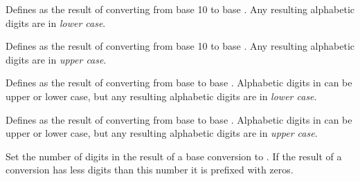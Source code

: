 \begin{command}{\pgfmathdectobase{}}
	Defines  as the result of converting  from
	base 10 to base . Any resulting alphabetic digits are in
	\emph{lower case}.
	
\begin{codeexample}[]
\pgfmathdectobase{} \mynumber
\end{codeexample}

\end{command}

\begin{command}{\pgfmathdectoBase{}}
	Defines  as the result of converting  from
	base 10 to base . Any resulting alphabetic digits are in
	\emph{upper case}.
	
\begin{codeexample}[]
\pgfmathdectoBase{} \mynumber
\end{codeexample}

\end{command}

\begin{command}{\pgfmathbasetobase{}}
	Defines  as the result of converting  from
	base  to base . Alphabetic digits in 
	 can be upper or lower case, but any resulting 
	alphabetic digits are in \emph{lower case}.
	
\begin{codeexample}[]
\pgfmathbasetobase{} \mynumber
\end{codeexample}

\end{command}

\begin{command}{\pgfmathbasetoBase{}}
	Defines  as the result of converting  from
	base  to base . Alphabetic digits in 
	 can be upper or lower case, but any resulting 
	alphabetic digits are in \emph{upper case}.
	
\begin{codeexample}[]
\pgfmathbasetoBase{} \mynumber
\end{codeexample}

\end{command}


\begin{command}{\pgfmathsetbasenumberlength{}}
	Set the number of digits in the result of a base conversion to 
	. If the result of a conversion has less digits
	than this number it is prefixed with zeros.

\begin{codeexample}[]
\pgfmathdectobase{} \mynumber
\end{codeexample}

\end{command}